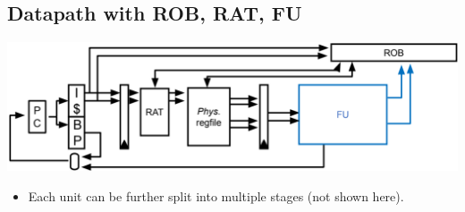 \documentclass[10pt]{article}
\begin{document}
\subsection*{Datapath with ROB, RAT, FU}
\begin{center}
    \includegraphics*[scale=0.7]{W5_11.png}
\end{center}
\begin{itemize}
    \item Each unit can be further split into multiple stages (not shown here).
\end{itemize}
\end{document}
